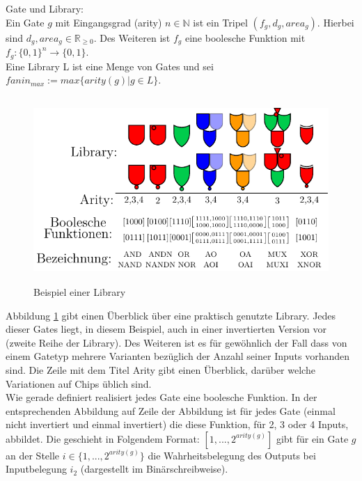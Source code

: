 \documentclass[11pt, a4paper, german]{article}
\begin{document}
\begin{definition}{Gate und Library:}\label{def:gate}\\
Ein Gate $g$ mit Eingangsgrad (arity) $ n \in \mathbb{N}$ ist ein Tripel $(f_g, d_g, area_g)$. Hierbei sind $d_g, area_g \in \mathbb{R}_{\geq 0}$. Des Weiteren ist $f_g$ eine boolesche Funktion mit $ f_g : \{0,1\}^n \rightarrow \{0, 1\} $. \\
Eine Library L ist eine Menge von Gates und sei \\ 
$fanin_{max} := max\{ arity(g) | g \in L \}$.
\end{definition}
\begin{figure}[h]
\begin{center}
 \includegraphics[height = 200pt]{./pictures/compiled/new_library.pdf}
 \caption{Beispiel einer Library}
 \label{bild:new_library}
\end{center}
\end{figure}
Abbildung \ref{bild:new_library} gibt einen Überblick über eine praktisch genutzte Library. Jedes dieser Gates liegt, in diesem Beispiel, auch in einer invertierten Version vor (zweite Reihe der Library). Des Weiteren ist es für gewöhnlich der Fall dass von einem Gatetyp mehrere Varianten bezüglich der Anzahl seiner Inputs vorhanden sind. Die Zeile mit dem Titel Arity gibt einen Überblick, darüber welche Variationen auf Chips üblich sind.\\
Wie gerade definiert realisiert jedes Gate eine boolesche Funktion. In der entsprechenden Abbildung auf Zeile der Abbildung ist für jedes Gate (einmal nicht invertiert und einmal invertiert) die diese Funktion, für 2, 3 oder 4 Inputs, abbildet. Die geschieht in Folgendem Format: $[1,...,2^{arity(g)} ]$ gibt für ein Gate $g$ an der Stelle $i \in \{1,...,2^{arity(g)}\}$ die Wahrheitsbelegung des Outputs bei Inputbelegung $i_2$ (dargestellt im Binärschreibweise). \\
\end{document}
